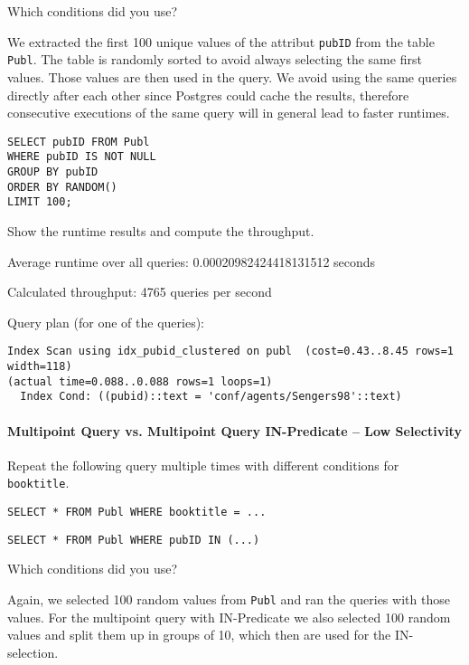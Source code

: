 \documentclass[11pt]{scrartcl}
\begin{document}
Which conditions did you use?

We extracted the first 100 unique values of the attribut \texttt{pubID} from the table \texttt{Publ}. The table is randomly sorted to avoid always selecting the same first values. Those values are then used in the query. We avoid using the same queries directly after each other since Postgres could cache the results, therefore consecutive executions of the same query will in general lead to faster runtimes.

\begin{lstlisting}[style=dbtsql]
SELECT pubID FROM Publ
WHERE pubID IS NOT NULL 
GROUP BY pubID
ORDER BY RANDOM() 
LIMIT 100;
\end{lstlisting}

Show the runtime results and compute the throughput.

Average runtime over all queries: 0.00020982424418131512 seconds

Calculated throughput: 4765 queries per second

Query plan (for one of the queries):

{\small
\parskip0pt\begin{verbatim}
Index Scan using idx_pubid_clustered on publ  (cost=0.43..8.45 rows=1 width=118) 
(actual time=0.088..0.088 rows=1 loops=1)
  Index Cond: ((pubid)::text = 'conf/agents/Sengers98'::text)
\end{verbatim}}

\paragraph{Multipoint Query vs. Multipoint Query IN-Predicate -- Low Selectivity}

Repeat the following query multiple times with different conditions for \texttt{booktitle}.

\begin{lstlisting}[style=dbtsql]
SELECT * FROM Publ WHERE booktitle = ...
\end{lstlisting}

\begin{lstlisting}[style=dbtsql]
SELECT * FROM Publ WHERE pubID IN (...)
\end{lstlisting}

Which conditions did you use?

Again, we selected 100 random values from \texttt{Publ} and ran the queries with those values. For the multipoint query with IN-Predicate we also selected 100 random values and split them up in groups of 10, which then are used for the IN-selection.
\end{document}
